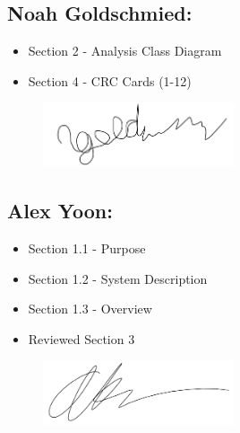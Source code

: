 \documentclass[]{article}
\begin{document}
\subsection*{Noah Goldschmied:}
\begin{itemize}
	\item Section 2 - Analysis Class Diagram
	\item Section 4 - CRC Cards (1-12)
\end{itemize}
\begin{figure}[h]
	\centering
	\includegraphics[width=0.5\textwidth]{NoahSignature.png}
	\label{fig:signature}
\end{figure}

\subsection*{Alex Yoon:}
\begin{itemize}
	\item Section 1.1 - Purpose
	\item Section 1.2 - System Description
	\item Section 1.3 - Overview
	\item Reviewed Section 3
\end{itemize}
\begin{figure}[h]
	\centering
	\includegraphics[width=0.5\textwidth]{AlexSignature.png}
	\label{fig:signature}
\end{figure}
\end{document}
